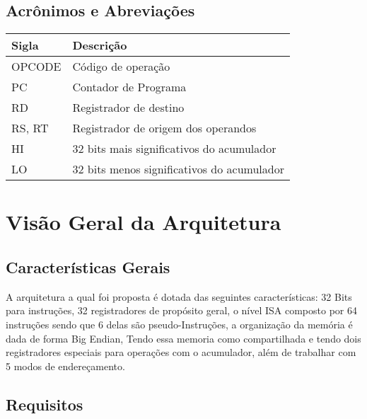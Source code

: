 \documentclass{report}
\begin{document}
  \section{Acrônimos e Abreviações}
    \FloatBarrier
    \begin{table}[H]
      \begin{center}
        \begin{tabular}[pos]{|m{2cm} | m{12cm}|} 
          \hline
          \cellcolor[gray]{0.9}\textbf{Sigla} & \cellcolor[gray]{0.9}\textbf{Descrição} \\ \hline
              OPCODE  & Código de operação  \\ \hline
              PC  & Contador de Programa  \\ \hline
              RD  & Registrador de destino  \\ \hline
              RS, RT  & Registrador de origem dos operandos\\ \hline
              HI  & 32 bits mais significativos do acumulador  \\ \hline
              LO  & 32 bits menos significativos do acumulador  \\ \hline
        \end{tabular}
      \end{center}
    \end{table}  

\chapter{Visão Geral da Arquitetura}

    \section{Características Gerais}
A arquitetura a qual foi proposta é dotada das seguintes características:  32 Bits para instruções, 32 registradores de propósito geral, o nível ISA composto por 64 instruções sendo que  6 delas são pseudo-Instruções, a organização da memória é dada de forma Big Endian, Tendo essa memoria como compartilhada  e tendo dois registradores especiais para operações com o acumulador, além de trabalhar com 5 modos de endereçamento.
  
  
  \section{Requisitos}
  
\end{document}

